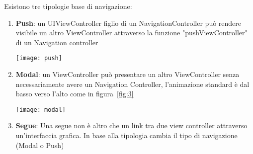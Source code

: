 Esistono tre tipologie base di navigazione:

\begin{enumerate}
    \item{\textbf{Push}: un UIViewController figlio di un NavigationController può rendere
    visibile un altro ViewController attraverso la funzione "pushViewController" di un Navigation controller\par
    \begin{minipage}{\linewidth}
        \centering
        \texttt{[image: push]}
        \label{fig:2}
    \end{minipage}
    }
    \item{ \textbf{Modal}: un ViewController può presentare un altro ViewController senza necessariamente avere un 
        Navigation Controller, l'animazione standard è dal basso verso l'alto come in figura~\ref{fig:3}\par
        \begin{minipage}{\linewidth}
            \centering
            \texttt{[image: modal]}
            \label{fig:3}
        \end{minipage}
    }
    \item{\textbf{Segue}: Una segue non è altro che un link tra due view controller attraverso un'interfaccia
        grafica. In base alla tipologia cambia il tipo di navigazione (Modal o Push)
    }
\end{enumerate}





